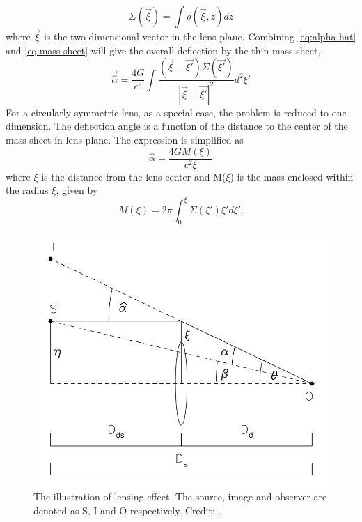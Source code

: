 \documentclass[letter,12pt]{article}
\begin{document}
  \begin{equation}
\Sigma(\vec{\xi}) = \int \rho(\vec{\xi}, z)dz \label{eq:mass-sheet}
  \end{equation}
where \(\vec{\xi}\) is the two-dimensional vector in the
lens plane. Combining \eqref{eq:alpha-hat} and \eqref{eq:mass-sheet}
will give the overall deflection by the thin mass sheet,
\begin{equation}
\vec{\hat{\alpha}} = \frac{4G}{c^2} \int \frac{(\vec{\xi}-\vec{\xi'})\Sigma(\vec{\xi'})}{|\vec{\xi}-\vec{\xi'}|^2} d^2 \xi'
\label{eq:alpha-mass-sum}
\end{equation}
For a circularly symmetric lens, as a special case, the problem is
reduced to one-dimension. The deflection angle is a function of the
distance to the center of the mass sheet in lens plane. The
expression is simplified as
\begin{equation}
\hat{\alpha} = \frac{4GM(\xi)}{c^2\xi}
\label{eq:alpha-mass-1D}
\end{equation}
where \(\xi\) is the distance from the lens center and M(\(\xi\)) is the
mass enclosed within the radius \(\xi\), given by
\begin{equation}
M(\xi) = 2\pi \int^{\xi}_0 \Sigma(\xi')\xi'd\xi'.
\label{eq:m-1D}
\end{equation}

\begin{figure}[htbp]
\centering
\includegraphics[width=.9\linewidth]{./figures/one_image.png}
\caption{\label{fig:org00b0bea}The illustration of lensing effect. The source, image and observer are denoted as S, I and O respectively. Credit: \cite{narayanlectures1997}.}
\end{figure}
\end{document}
